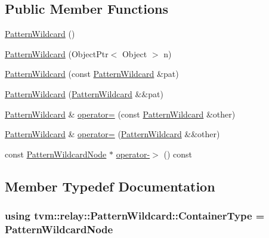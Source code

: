 \subsection*{Public Member Functions}
\begin{DoxyCompactItemize}
\item 
\hyperlink{classtvm_1_1relay_1_1PatternWildcard_aab7d1690088beab9987f97cdebd64c0c}{Pattern\+Wildcard} ()
\item 
\hyperlink{classtvm_1_1relay_1_1PatternWildcard_a53a536533ee2c7ae4f0fcb649fc967c3}{Pattern\+Wildcard} (Object\+Ptr$<$ Object $>$ n)
\item 
\hyperlink{classtvm_1_1relay_1_1PatternWildcard_aea56c9cc7113d61aee41cd6569aef9d5}{Pattern\+Wildcard} (const \hyperlink{classtvm_1_1relay_1_1PatternWildcard}{Pattern\+Wildcard} \&pat)
\item 
\hyperlink{classtvm_1_1relay_1_1PatternWildcard_ae1c2f200c747fff85c9131c98648d4dd}{Pattern\+Wildcard} (\hyperlink{classtvm_1_1relay_1_1PatternWildcard}{Pattern\+Wildcard} \&\&pat)
\item 
\hyperlink{classtvm_1_1relay_1_1PatternWildcard}{Pattern\+Wildcard} \& \hyperlink{classtvm_1_1relay_1_1PatternWildcard_aef430b36a4be504969829f800e126245}{operator=} (const \hyperlink{classtvm_1_1relay_1_1PatternWildcard}{Pattern\+Wildcard} \&other)
\item 
\hyperlink{classtvm_1_1relay_1_1PatternWildcard}{Pattern\+Wildcard} \& \hyperlink{classtvm_1_1relay_1_1PatternWildcard_a98237b6a6448ba4ed10f64c3016eb4e2}{operator=} (\hyperlink{classtvm_1_1relay_1_1PatternWildcard}{Pattern\+Wildcard} \&\&other)
\item 
const \hyperlink{classtvm_1_1relay_1_1PatternWildcardNode}{Pattern\+Wildcard\+Node} $\ast$ \hyperlink{classtvm_1_1relay_1_1PatternWildcard_a4cb3642050a1c176027ef270ade6f964}{operator-\/$>$} () const 
\end{DoxyCompactItemize}


\subsection{Member Typedef Documentation}
\subsubsection[{\texorpdfstring{Container\+Type}{ContainerType}}]{\setlength{\rightskip}{0pt plus 5cm}using {\bf tvm\+::relay\+::\+Pattern\+Wildcard\+::\+Container\+Type} =  {\bf Pattern\+Wildcard\+Node}}\hypertarget{classtvm_1_1relay_1_1PatternWildcard_a518c21bb2fb07129a3847ee37653d8ec}{}\label{classtvm_1_1relay_1_1PatternWildcard_a518c21bb2fb07129a3847ee37653d8ec}


